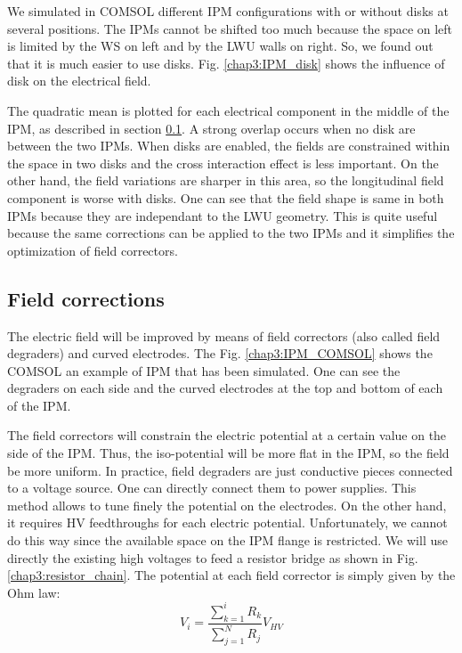 \begin{refsection}
	We simulated in COMSOL different IPM configurations with or without disks at several positions. The IPMs cannot be shifted too much because the space on left is limited by the WS on left and by the LWU walls on right. So, we found out that it is much easier to use disks. Fig. \ref{chap3:IPM_disk} shows the influence of disk on the electrical field.

	

	The quadratic mean is plotted for each electrical component in the middle of the IPM, as described in section \ref{}. A strong overlap occurs when no disk are between the two IPMs. When disks are enabled, the fields are constrained within the space in two disks and the cross interaction effect is less important. On the other hand, the field variations are sharper in this area, so the longitudinal field component is worse with disks. One can see that the field shape is same in both IPMs because they are independant to the LWU geometry. This is quite useful because the same corrections can be applied to the two IPMs and it simplifies the optimization of field correctors.

	\clearpage
	\subsection{Field corrections}
	
	The electric field will be improved by means of field correctors (also called field degraders) and curved electrodes. The Fig. \ref{chap3:IPM_COMSOL} shows the COMSOL an example of IPM that has been simulated. One can see the degraders on each side and the curved electrodes at the top and bottom of each of the IPM.

	The field correctors will constrain the electric potential at a certain value on the side of the IPM. Thus, the iso-potential will be more flat in the IPM, so the field be more uniform. In practice, field degraders are just conductive pieces connected to a voltage source. One can directly connect them to power supplies. This method allows to tune finely the potential on the electrodes.
	On the other hand, it requires HV feedthroughs for each electric potential. Unfortunately, we cannot do this way since the available space on the IPM flange is restricted. We will use directly the existing high voltages to feed a resistor bridge as shown in Fig. \ref{chap3:resistor_chain}. The potential at each field corrector is simply given by the Ohm law:
	\begin{equation}
		V_{i} = \frac{\sum_{k = 1}^{i} R_{k}}{\sum_{j = 1}^{N} R_{j}}V_{HV}
	\end{equation}


\end{refsection}
